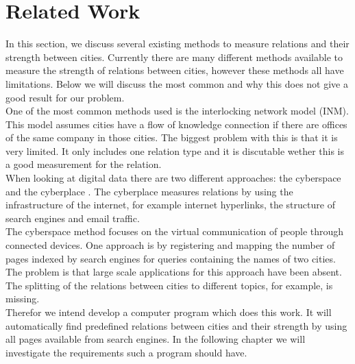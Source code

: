 \section{Related Work}
In this section, we discuss several existing methods to measure relations and their strength between cities. Currently there are many different methods available to measure the strength of relations between cities, however these methods all have limitations. Below we will discuss the most common and why this does not give a good result for our problem.\\

One of the most common methods used is the interlocking network model (INM)\cite{taylor2012interlocking}. This model assumes cities have a flow of knowledge connection if there are offices of the same company in those cities. The biggest problem with this is that it is very limited. It only includes one relation type and it is discutable wether this is a good measurement for the relation. \\

When looking at digital data there are two different approaches: the cyberspace and the cyberplace \cite{devriendt2008cyberplace}. The cyberplace measures relations by using the infrastructure of the internet, for example internet hyperlinks, the structure of search engines and email traffic.\\
The cyberspace method focuses on the virtual communication of people through connected devices. One approach is by registering and mapping the number of pages indexed by search engines for queries containing the names of two cities. The problem is that large scale applications for this approach have been absent. The splitting of the relations between cities to different topics, for example, is missing. \\

Therefor we intend develop a computer program which does this work. It will automatically find predefined relations between cities and their strength by using all pages available from search engines. In the following chapter we will investigate the requirements such a program should have.